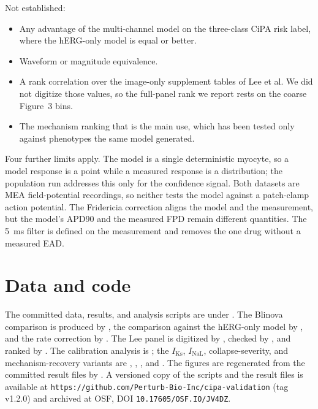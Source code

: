 \documentclass[preprint,12pt]{elsarticle}
\begin{document}
Not established:
\begin{itemize}
\item Any advantage of the multi-channel model on the three-class CiPA risk
label, where the hERG-only model is equal or better.
\item Waveform or magnitude equivalence.
\item A rank correlation over the image-only supplement tables of Lee et al. We did not
digitize those values, so the full-panel rank we report rests on the coarse Figure~3 bins.
\item The mechanism ranking that is the main use, which has been tested only against
phenotypes the same model generated.
\end{itemize}

Four further limits apply. The model is a single deterministic myocyte, so a model
response is a point while a measured response is a distribution; the population run
addresses this only for the confidence signal. Both datasets are MEA field-potential
recordings, so neither tests the model against a patch-clamp action potential. The
Fridericia correction aligns the model and the measurement, but the model's APD90 and
the measured FPD remain different quantities. The 5~ms filter is defined on
the measurement and removes the one drug without a measured EAD.

\section*{Data and code}
The committed data, results, and analysis scripts are under .
The Blinova comparison is produced by
, the comparison against the hERG-only model by , and
the rate correction by . The Lee panel is digitized by
, checked by , and ranked by
. The calibration analysis is
; the $I_{\mathrm{Ks}}$, $I_{\mathrm{NaL}}$, collapse-severity,
and mechanism-recovery variants are ,
, , and
. The figures are regenerated from the committed result
files by . A versioned copy of the scripts and the result
files is available at \texttt{https://github.com/Perturb-Bio-Inc/cipa-validation} (tag
v1.2.0) and archived at OSF, DOI \texttt{10.17605/OSF.IO/JV4DZ}.
\end{document}
